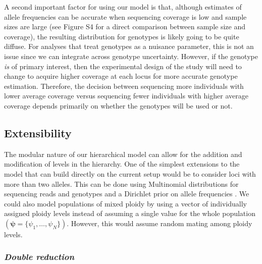 \documentclass[11pt,english,letterpaper,oneside]{article}
\begin{document}
A second important factor for using our model is that, although estimates of allele frequencies can be accurate when sequencing coverage is low and sample sizes are large (see Figure S4 for a direct comparison between sample size and coverage), the resulting distribution for genotypes is likely going to be quite diffuse. For analyses that treat genotypes as a nuisance parameter, this is not an issue since we can integrate across genotype uncertainty. However, if the genotype \textit{is} of primary interest, then the experimental design of the study will need to change to acquire higher coverage at each locus for more accurate genotype estimation. Therefore, the decision between sequencing more individuals with lower average coverage versus sequencing fewer individuals with higher average coverage depends primarily on whether the genotypes will be used or not.

\medskip
\subsection{Extensibility}
\medskip

The modular nature of our hierarchical model can allow for the addition and modification of levels in the hierarchy. One of the simplest extensions to the model that can build directly on the current setup would be to consider loci with more than two alleles. This can be done using Multinomial distributions for sequencing reads and genotypes and a Dirichlet prior on allele frequencies \citep[the Multinomial and Dirichlet distributions form a conjugate family;][]{gelman2014bayesian}. We could also model populations of mixed ploidy by using a vector of individually assigned ploidy levels instead of assuming a single value for the whole population $(\bm{\psi} = \{\psi_1,\ldots,\psi_N\})$. However, this would assume random mating among ploidy levels.
\medskip


\subsubsection{{\itshape Double reduction}}
\medskip
\end{document}
